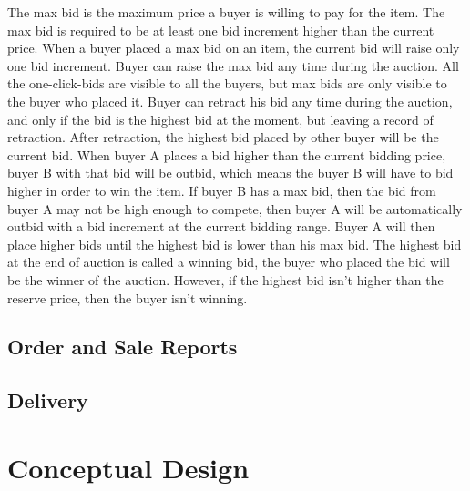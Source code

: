 \documentclass[12pt]{article}
\begin{document}
\par The max bid is the maximum price a buyer is willing to pay for the item. The max bid is required to be at least one bid increment higher than the current price. When a buyer placed a max bid on an item, the current bid will raise only one bid increment. Buyer can raise the max bid any time during the auction. All the one-click-bids are visible to all the buyers, but max bids are only visible to the buyer who placed it. Buyer can retract his bid any time during the auction, and only if the bid is the highest bid at the moment, but leaving a record of retraction. After retraction, the highest bid placed by other buyer will be the current bid. When buyer A places a bid higher than the current bidding price, buyer B with that bid will be outbid, which means the buyer B will have to bid higher in order to win the item. If buyer B has a max bid, then the bid from buyer A may not be high enough to compete, then buyer A will be automatically outbid with a bid increment at the current bidding range. Buyer A will then place higher bids until the highest bid is lower than his max bid. The highest bid at the end of auction is called a winning bid, the buyer who placed the bid will be the winner of the auction. However, if the highest bid isn't higher than the reserve price, then the buyer isn't winning.

\subsection{Order and Sale Reports}

\subsection{Delivery}

\newpage

\section{Conceptual Design}
\newpage
\end{document}

